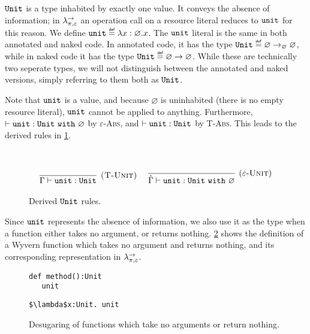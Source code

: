 $\mathtt{Unit}$ is a type inhabited by exactly one value. It conveys the absence of information; in $\lambda^{\rightarrow}_{\pi, \varepsilon}$ an operation call on a resource literal reduces to $\mathtt{unit}$ for this reason. We define $\unit \defn \lambda x: \varnothing. x$. The $\mathtt{unit}$ literal is the same in both annotated and naked code. In annotated code, it has the type $\Unit \defn \varnothing \rightarrow_{\varnothing} \varnothing$, while in naked code it has the type $\Unit \defn \varnothing \rightarrow \varnothing$. While these are technically two seperate types, we will not distinguish between the annotated and naked versions, simply referring to them both as $\mathtt{Unit}$.

Note that $\mathtt{unit}$ is a value, and because $\varnothing$ is uninhabited (there is no empty resource literal), $\mathtt{unit}$ cannot be applied to anything. Furthermore, $\vdash \mathtt{unit}: \mathtt{Unit}~\mathtt{with}~ \varnothing$ by \textsc{$\varepsilon$-Abs}, and $\vdash \mathtt{unit}: \mathtt{Unit}$ by \textsc{T-Abs}. This leads to the derived rules in \ref{fig:unit_rules}.

\begin{figure}[h]


 \\


\[
\begin{array}{c}

\infer[\textsc{(T-Unit)}]
	{\Gamma \vdash \unit : \Unit}
	{} ~~~~

\infer[(\textsc{$\varepsilon$-Unit})]
	{\hat \Gamma \vdash \unit : \Unit~\kw{with} \varnothing}
	{}

\end{array}
\]

\caption{Derived $\mathtt{Unit}$ rules.}
\label{fig:unit_rules}
\end{figure}

Since $\mathtt{unit}$ represents the absence of information, we also use it as the type when a function either takes no argument, or returns nothing. \ref{fig:unit_sugaring} shows the definition of a Wyvern function which takes no argument and returns nothing, and its corresponding representation in $\lambda^{\rightarrow}_{\pi, \varepsilon}$.

\begin{figure}[h]

\begin{lstlisting}
def method():Unit
   unit
\end{lstlisting}

\begin{lstlisting}
$\lambda$x:Unit. unit
\end{lstlisting}

\caption{Desugaring of functions which take no arguments or return nothing.}
\label{fig:unit_sugaring}
\end{figure}


